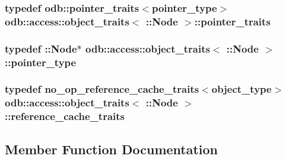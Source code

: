 \subsubsection[{pointer\+\_\+traits}]{\setlength{\rightskip}{0pt plus 5cm}typedef odb\+::pointer\+\_\+traits$<${\bf pointer\+\_\+type}$>$ odb\+::access\+::object\+\_\+traits$<$ \+::{\bf Node} $>$\+::{\bf pointer\+\_\+traits}}\label{classodb_1_1access_1_1object__traits_3_01_1_1_node_01_4_a98d8e6a44132407a0e45c0fcaf2251f3}
\hypertarget{classodb_1_1access_1_1object__traits_3_01_1_1_node_01_4_aa20d42b33b05f5d915cdc49dad07b8ad}{}
\subsubsection[{pointer\+\_\+type}]{\setlength{\rightskip}{0pt plus 5cm}typedef \+::{\bf Node}$\ast$ odb\+::access\+::object\+\_\+traits$<$ \+::{\bf Node} $>$\+::{\bf pointer\+\_\+type}}\label{classodb_1_1access_1_1object__traits_3_01_1_1_node_01_4_aa20d42b33b05f5d915cdc49dad07b8ad}
\hypertarget{classodb_1_1access_1_1object__traits_3_01_1_1_node_01_4_af76272870045278b993f0e8805aa95b8}{}
\subsubsection[{reference\+\_\+cache\+\_\+traits}]{\setlength{\rightskip}{0pt plus 5cm}typedef no\+\_\+op\+\_\+reference\+\_\+cache\+\_\+traits$<${\bf object\+\_\+type}$>$ odb\+::access\+::object\+\_\+traits$<$ \+::{\bf Node} $>$\+::{\bf reference\+\_\+cache\+\_\+traits}}\label{classodb_1_1access_1_1object__traits_3_01_1_1_node_01_4_af76272870045278b993f0e8805aa95b8}


\subsection{Member Function Documentation}
\hypertarget{classodb_1_1access_1_1object__traits_3_01_1_1_node_01_4_aaecdc7fdaaa3c822fd56c64507eab448}{}
